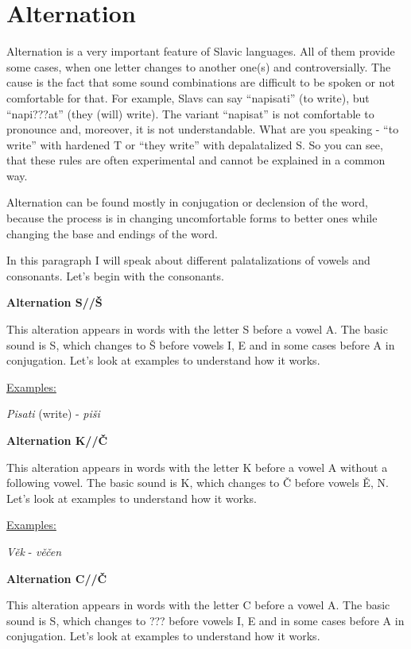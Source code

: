 \section{Alternation}

Alternation is a very important feature of Slavic languages. All of them provide some cases, when one letter changes to another one(s) and controversially. The cause is the fact that some sound combinations are difficult to be spoken or not comfortable for that. For example, Slavs can say “napisati” (to write), but “napi???at” (they (will) write). The variant “napisat” is not comfortable to pronounce and, moreover, it is not understandable. What are you speaking - “to write” with hardened T or “they write” with depalatalized S. So you can see, that these rules are often experimental and cannot be explained in a common way.

Alternation can be found mostly in conjugation or declension of the word, because the process is in changing uncomfortable forms to better ones while changing the base and endings of the word. 

In this paragraph I will speak about different palatalizations of vowels and consonants. Let’s begin with the consonants.

\textbf{Alternation S//Š}

This alteration appears in words with the letter S before a vowel A. The basic sound is S, which changes to Š before vowels I, E and in some cases before A in conjugation. Let’s look at examples to understand how it works.

\underline{Examples:}

\textit{Pisati} (write) \textipa{[’pisat1]} - \textit{piši} \textipa{[pi’\:s1]}

\textbf{Alternation K//Č}

This alteration appears in words with the letter K before a vowel A without a following vowel. The basic sound is K, which changes to Č before vowels Ě, N. Let’s look at examples to understand how it works.

\underline{Examples:}

\textit{Věk} \textipa{[’pisat1]} - \textit{věčen} \textipa{[pi’\:s1]}

\textbf{Alternation C//Č}

This alteration appears in words with the letter C before a vowel A. The basic sound is S, which changes to ??? before vowels I, E and in some cases before A in conjugation. Let’s look at examples to understand how it works.

